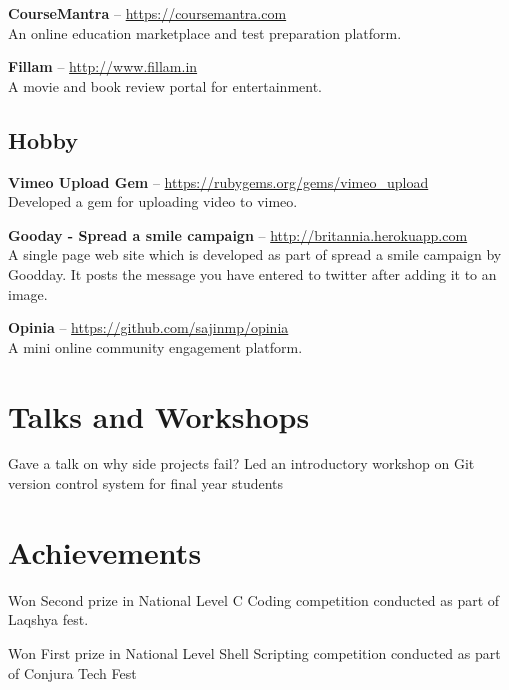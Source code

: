 \documentclass[11pt,a4paper]{moderncv}
\begin{document}
\cvlistitem
{\textbf{CourseMantra} -- {\small \href{https://coursemantra.com}{https://coursemantra.com}}
  \\An online education marketplace and test preparation platform.
}

\cvlistitem
{\textbf{Fillam} -- {\small \href{http://www.fillam.in}{http://www.fillam.in}}
  \\A movie and book review portal for entertainment.
}


\subsection{Hobby}

\cvlistitem
{\textbf{Vimeo Upload Gem} -- {\small \href{https://rubygems.org/gems/vimeo\_upload}{https://rubygems.org/gems/vimeo\_upload}}
  \\Developed a gem for uploading video to vimeo.
}

\cvlistitem
{\textbf{Gooday - Spread a smile campaign} -- {\small \href{http://britannia.herokuapp.com}{http://britannia.herokuapp.com}}
  \\A single page web site which is developed as part of spread a smile campaign by\\
  Goodday. It posts the message you have entered to twitter after adding it to an\\
  image.
}

\cvlistitem
{\textbf{Opinia} -- {\small \href{https://github.com/sajinmp/opinia}{https://github.com/sajinmp/opinia}}
  \\A mini online community engagement platform.
}




\section{Talks and Workshops}
{Gave a talk on why side projects fail?}
{Led an introductory workshop on Git version control system for final year students} 


\section{Achievements}

{Won Second prize in National Level C Coding competition conducted as part of Laqshya fest.}

{Won First prize in National Level Shell Scripting competition conducted as part of Conjura Tech Fest}


\end{document}
